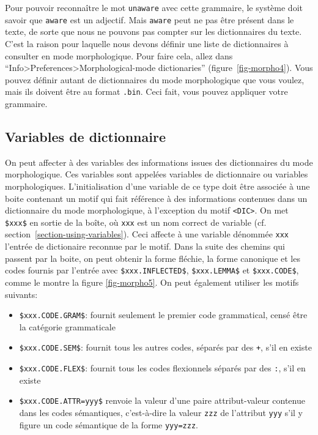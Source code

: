\bigskip
\noindent Pour pouvoir reconnaître le mot 
\verb+unaware+ avec cette grammaire, le système doit savoir que \verb+aware+ est un adjectif. Mais
\verb+aware+ peut ne pas être présent dans le texte, de sorte que nous ne pouvons pas compter
sur les dictionnaires du texte. C'est la raison pour laquelle nous devons définir une liste de
dictionnaires à consulter en mode morphologique.
Pour faire cela, allez dans ``Info>Preferences>Morphological-mode dictionaries''
(figure~\ref{fig-morpho4}).
Vous pouvez définir autant de dictionnaires du mode morphologique que vous voulez, mais ils doivent
être au format \verb+.bin+. Ceci fait, vous pouvez appliquer votre grammaire.

\subsection{Variables de dictionnaire}
\label{dictionary-variables}
On peut affecter à des variables des informations issues des dictionnaires du mode morphologique.
Ces variables sont appelées variables de dictionnaire ou variables morphologiques.
L'initialisation d'une variable de ce type doit être associée à une boite contenant un motif
qui fait référence à des informations contenues dans un dictionnaire du mode morphologique,
à l'exception du motif \verb+<DIC>+. On met \verb+$xxx$+ en sortie de la boîte, où \verb+xxx+ est un nom
correct de variable (cf. section~\ref{section-using-variables}). Ceci affecte à une  variable dénommée \verb+xxx+
l'entrée de dictionaire reconnue par le motif.
Dans la suite des chemins qui passent par la boite, on peut obtenir la forme fléchie, la forme canonique et les codes fournis par l'entrée avec
\verb+$xxx.INFLECTED$+, \verb+$xxx.LEMMA$+ et \verb+$xxx.CODE$+, comme le montre la figure
\ref{fig-morpho5}.
On peut également utiliser les motifs suivants:

\begin{itemize}
\item \verb+$xxx.CODE.GRAM$+: fournit seulement le premier code grammatical,
	censé être la catégorie grammaticale
  
\item \verb+$xxx.CODE.SEM$+: fournit tous les autres codes,
	séparés par des \verb$+$, s'il en existe
  
\item \verb+$xxx.CODE.FLEX$+: fournit tous les codes flexionnels
  séparés par des \verb$:$, s'il en existe

\item \verb+$xxx.CODE.ATTR=yyy$+ renvoie la valeur d'une paire attribut-valeur contenue dans les codes sémantiques, c'est-à-dire la valeur \verb+zzz+ de l'attribut \verb+yyy+ s'il y figure un  code sémantique de la forme \verb+yyy=zzz+.

\end{itemize}
	
